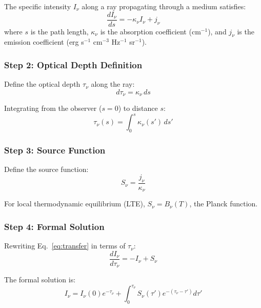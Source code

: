 \documentclass[twocolumn,amsmath,amssymb,prd,superscriptaddress,nofootinbib]{revtex4-2}
\begin{document}
The specific intensity $I_\nu$ along a ray propagating through a medium satisfies:
\begin{equation}
    \frac{dI_\nu}{ds} = -\kappa_\nu I_\nu + j_\nu
    \label{eq:transfer}
\end{equation}
where $s$ is the path length, $\kappa_\nu$ is the absorption coefficient (cm$^{-1}$), and $j_\nu$ is the emission coefficient (erg s$^{-1}$ cm$^{-3}$ Hz$^{-1}$ sr$^{-1}$).

\subsubsection{Step 2: Optical Depth Definition}

Define the optical depth $\tau_\nu$ along the ray:
\begin{equation}
    d\tau_\nu = \kappa_\nu \, ds
    \label{eq:tau_def}
\end{equation}

Integrating from the observer ($s=0$) to distance $s$:
\begin{equation}
    \tau_\nu(s) = \int_0^s \kappa_\nu(s') \, ds'
\end{equation}

\subsubsection{Step 3: Source Function}

Define the source function:
\begin{equation}
    S_\nu = \frac{j_\nu}{\kappa_\nu}
    \label{eq:source_func}
\end{equation}

For local thermodynamic equilibrium (LTE), $S_\nu = B_\nu(T)$, the Planck function.

\subsubsection{Step 4: Formal Solution}

Rewriting Eq.~\eqref{eq:transfer} in terms of $\tau_\nu$:
\begin{equation}
    \frac{dI_\nu}{d\tau_\nu} = -I_\nu + S_\nu
\end{equation}

The formal solution is:
\begin{equation}
    \boxed{I_\nu = I_\nu(0) e^{-\tau_\nu} + \int_0^{\tau_\nu} S_\nu(\tau') e^{-(\tau_\nu - \tau')} d\tau'}
    \label{eq:formal_solution}
\end{equation}
\end{document}

